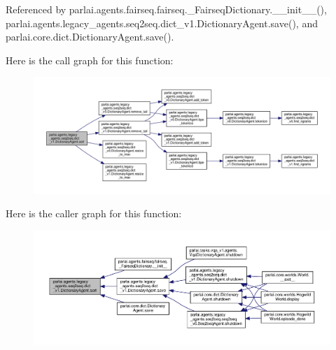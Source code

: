 Referenced by parlai.\+agents.\+fairseq.\+fairseq.\+\_\+\+Fairseq\+Dictionary.\+\_\+\+\_\+init\+\_\+\+\_\+(), parlai.\+agents.\+legacy\+\_\+agents.\+seq2seq.\+dict\+\_\+v1.\+Dictionary\+Agent.\+save(), and parlai.\+core.\+dict.\+Dictionary\+Agent.\+save().

Here is the call graph for this function\+:
\nopagebreak
\begin{figure}[H]
\begin{center}
\leavevmode
\includegraphics[width=350pt]{classparlai_1_1agents_1_1legacy__agents_1_1seq2seq_1_1dict__v1_1_1DictionaryAgent_aa2697be1f1556da06f77d7eadf7cb9c6_cgraph}
\end{center}
\end{figure}
Here is the caller graph for this function\+:
\nopagebreak
\begin{figure}[H]
\begin{center}
\leavevmode
\includegraphics[width=350pt]{classparlai_1_1agents_1_1legacy__agents_1_1seq2seq_1_1dict__v1_1_1DictionaryAgent_aa2697be1f1556da06f77d7eadf7cb9c6_icgraph}
\end{center}
\end{figure}
\mbox{\label{classparlai_1_1agents_1_1legacy__agents_1_1seq2seq_1_1dict__v1_1_1DictionaryAgent_a995253a4769e95991e0ba9174a37f6aa}} 
